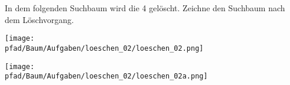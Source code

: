 \question[2]
In dem folgenden Suchbaum wird die 4 gelöscht. Zeichne den
Suchbaum nach dem Löschvorgang.

\texttt{[image: \\pfad/Baum/Aufgaben/loeschen\_02/loeschen\_02.png]}
\begin{solutionbox}{7cm}

\texttt{[image: \\pfad/Baum/Aufgaben/loeschen\_02/loeschen\_02a.png]}
\end{solutionbox}
